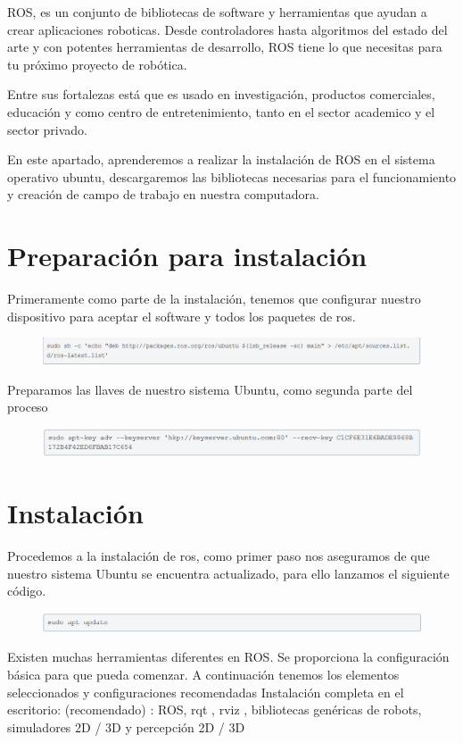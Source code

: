 \documentclass[11pt,a4paper,oldfontcommands,oneside]{memoir}
\begin{document}
ROS, es un conjunto de bibliotecas de software y herramientas que ayudan a crear aplicaciones roboticas. Desde controladores hasta algoritmos del estado del arte y con potentes herramientas de desarrollo, ROS tiene lo que necesitas para tu próximo proyecto de robótica. 

Entre sus fortalezas está que es usado en investigación, productos comerciales, educación y como centro de entretenimiento, tanto en el sector academico y el sector privado.

En este apartado, aprenderemos a realizar la instalación de ROS en el sistema operativo ubuntu, descargaremos las bibliotecas necesarias para el funcionamiento y creación de campo de trabajo en nuestra computadora. \cite{joseph2018kick}

\section{Preparación para instalación}
Primeramente como parte de la instalación, tenemos que configurar nuestro dispositivo para aceptar el software y todos los paquetes de ros.
\begin{figure}[h]
\includegraphics[scale=.8]{link1.png}
\end{figure}

Preparamos las llaves de nuestro sistema Ubuntu, como segunda parte del proceso
\begin{figure}[h]
\includegraphics[scale=.8]{link11.png}
\end{figure}

\section{Instalación}
Procedemos a la instalación de ros, como primer paso nos aseguramos de que nuestro sistema Ubuntu se encuentra actualizado, para ello lanzamos el siguiente código.
\begin{figure}[h]
\includegraphics[scale=.8]{link20.png}
\end{figure}
Existen muchas herramientas diferentes en ROS. Se proporciona la configuración básica para que pueda comenzar. 
A continuación tenemos los elementos seleccionados y configuraciones recomendadas
Instalación completa en el escritorio: (recomendado) : ROS, rqt , rviz , bibliotecas genéricas de robots, simuladores 2D / 3D y percepción 2D / 3D
\end{document}
